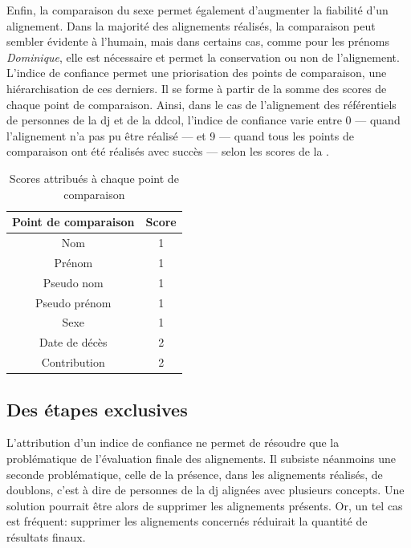 Enfin, la comparaison du sexe permet également d'augmenter la fiabilité d'un alignement. Dans la majorité des alignements réalisés, la comparaison peut sembler évidente à l'humain, mais dans certains cas, comme pour les prénoms \textit{Dominique}, elle est nécessaire et permet la conservation ou non de l'alignement.\\

L'indice de confiance permet une priorisation des points de comparaison, une hiérarchisation de ces derniers. Il se forme à partir de la somme des scores de chaque point de comparaison. Ainsi, dans le cas de l'alignement des référentiels de personnes de la \ac{dj} et de la \ac{ddcol}, l'indice de confiance varie entre 0 --- quand l'alignement n'a pas pu être réalisé --- et 9 --- quand tous les points de comparaison ont été réalisés avec succès --- selon les scores de la .
\begin{table}[!h]
	\centering
	\begin{tabular}{|c|c|}
		\hline
		\textbf{Point de comparaison}&\textbf{Score}\\ \hline
		Nom&1\\ \hline
		Prénom&1\\ \hline
		Pseudo nom&1\\ \hline
		Pseudo prénom&1\\ \hline
		Sexe&1\\ \hline
		Date de décès&2\\ \hline
		Contribution&2\\ \hline
	\end{tabular}
	\caption{Scores attribués à chaque point de comparaison}
	\label{table_scores}
\end{table}

\subsection{\label{III-C-2-b}Des étapes exclusives}

L'attribution d'un indice de confiance ne permet de résoudre que la problématique de l'évaluation finale des alignements. Il subsiste néanmoins une seconde problématique, celle de la présence, dans les alignements réalisés, de doublons, c'est à dire de personnes de la \ac{dj} alignées avec plusieurs concepts. Une solution pourrait être alors de supprimer les alignements présents. Or, un tel cas est fréquent: supprimer les alignements concernés réduirait la quantité de résultats finaux.\\

